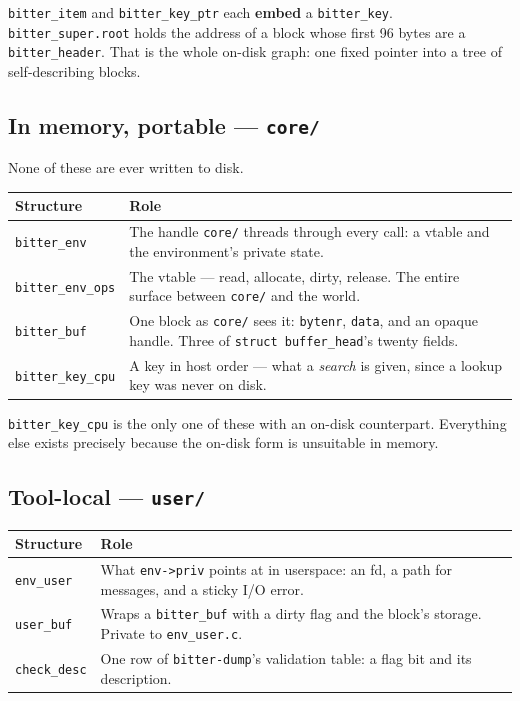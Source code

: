 \lstinline|bitter_item| and \lstinline|bitter_key_ptr| each \textbf{embed} a
\lstinline|bitter_key|. \lstinline|bitter_super.root| holds the address of a
block whose first 96 bytes are a \lstinline|bitter_header|. That is the whole
on-disk graph: one fixed pointer into a tree of self-describing blocks.

\subsection{In memory, portable --- \texttt{core/}}

None of these are ever written to disk.

\begin{center}
\begin{tabular}{lp{9cm}}
  \toprule
  Structure & Role \\
  \midrule
  \lstinline|bitter_env|      & The handle \texttt{core/} threads through every call: a vtable and the environment's private state. \\
  \lstinline|bitter_env_ops|  & The vtable --- read, allocate, dirty, release. The entire surface between \texttt{core/} and the world. \\
  \lstinline|bitter_buf|      & One block as \texttt{core/} sees it: \texttt{bytenr}, \texttt{data}, and an opaque handle. Three of \lstinline|struct buffer_head|'s twenty fields. \\
  \lstinline|bitter_key_cpu|  & A key in host order --- what a \emph{search} is given, since a lookup key was never on disk. \\
  \bottomrule
\end{tabular}
\end{center}

\lstinline|bitter_key_cpu| is the only one of these with an on-disk
counterpart. Everything else exists precisely because the on-disk form is
unsuitable in memory.

\subsection{Tool-local --- \texttt{user/}}

\begin{center}
\begin{tabular}{lp{9cm}}
  \toprule
  Structure & Role \\
  \midrule
  \lstinline|env_user|   & What \lstinline|env->priv| points at in userspace: an fd, a path for messages, and a sticky I/O error. \\
  \lstinline|user_buf|   & Wraps a \lstinline|bitter_buf| with a dirty flag and the block's storage. Private to \texttt{env\_user.c}. \\
  \lstinline|check_desc| & One row of \texttt{bitter-dump}'s validation table: a flag bit and its description. \\
  \bottomrule
\end{tabular}
\end{center}

